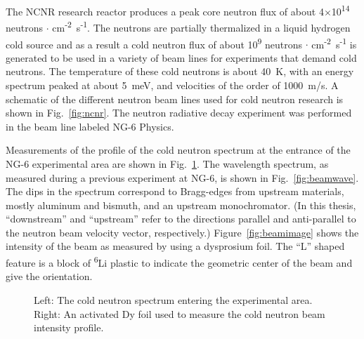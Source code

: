 \documentclass[oneside,12pt]{memoir}
\begin{document}
The NCNR research reactor produces a peak core neutron flux of about 4$\times$10\textsuperscript{14} neutrons $\cdot$ cm\textsuperscript{-2}~s\textsuperscript{-1}. The neutrons are partially thermalized in a liquid hydrogen cold source and as a result a cold neutron flux of about 10\textsuperscript{9} neutrons $\cdot$ cm\textsuperscript{-2}~s\textsuperscript{-1} is generated to be used in a variety of beam lines for experiments that demand cold neutrons. The temperature of these cold neutrons is about 40~K, with an energy spectrum peaked at about 5~meV, and velocities of the order of 1000~m/s. A schematic of the different neutron beam lines used for cold neutron research is shown in Fig.~\ref{fig:ncnr}. The neutron radiative decay experiment was performed in the beam line labeled NG-6 Physics.\par
Measurements of the profile of the cold neutron spectrum at the entrance of the NG-6 experimental area are shown in Fig.~\ref{fig:beamprofile}. The wavelength spectrum, as measured during a previous experiment at NG-6, is shown in Fig.~\ref{fig:beamwave}. The dips in the spectrum correspond to Bragg-edges from upstream materials, mostly aluminum and bismuth, and an upstream monochromator. (In this thesis, ``downstream'' and ``upstream'' refer to the directions parallel and anti-parallel to the neutron beam velocity vector, respectively.) Figure~\ref{fig:beamimage} shows the intensity of the beam as measured by using a dysprosium foil. The ``L'' shaped feature is a block of \textsuperscript{6}Li plastic to indicate the geometric center of the beam and give the orientation.
\begin{figure}[t]
	\caption[Beam image and wavelength]{Left: The cold neutron spectrum entering the experimental area. Right: An activated Dy foil used to measure the cold neutron beam intensity profile.}
	\label{fig:beamprofile}
\end{figure}
\end{document}
